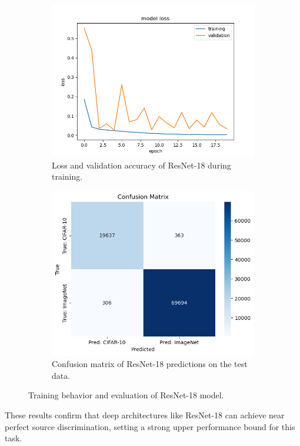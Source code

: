 \begin{figure}[H]
    \centering
    \begin{subfigure}[b]{0.48\textwidth}
        \centering
        \includegraphics[width=\textwidth]{Plots/ModelsAndResults/ResNet18_Loss.png}
        \caption{Loss and validation accuracy of ResNet-18 during training.}
        \label{fig:ResNet18_loss_plot}
    \end{subfigure}
    \hfill
    \begin{subfigure}[b]{0.48\textwidth}
        \centering
        \includegraphics[width=\textwidth]{Plots/ModelsAndResults/ResNet18_confusion_matrix.png}
        \caption{Confusion matrix of ResNet-18 predictions on the test data.}
        \label{fig:ResNet18_confusion_matrix_plot}
    \end{subfigure}
    \caption{Training behavior and evaluation of ResNet-18 model.}
    \label{fig:ResNet18_combined}
\end{figure}

These results confirm that deep architectures like ResNet-18 can achieve near perfect source discrimination, setting a strong upper performance bound for this task.
